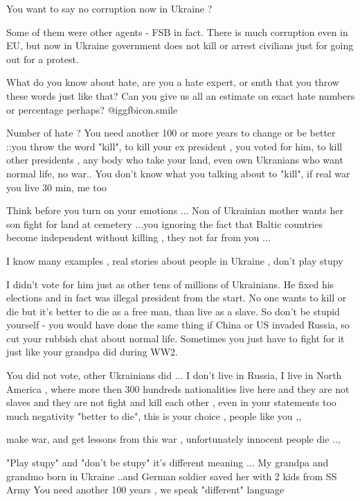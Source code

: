 \begin{itemize}
\begin{itemize}
You want to say no corruption now in Ukraine ?


Some of them were other agents - FSB in fact. There is much corruption even in
EU, but now in Ukraine government does not kill or arrest civilians just for
going out for a protest.

What do you know about hate, are you a hate expert, or smth that you throw
these words just like that? Can you give us all an estimate on exact hate
numbers or percentage perhaps?  @igg{fbicon.smile} 


Number of hate ? You need another 100 or more years to change or be better
::you throw the word "kill", to kill your ex president , you voted for him, to
kill other presidents , any body who take your land, even own Ukranians who
want normal life, no war.. You don't know what you talking about to "kill", if
real war you live 30 min, me too

Think before you turn on your emotions ... Non of Ukrainian mother wants her
son fight for land at cemetery ...you ignoring the fact that Baltic countries
become independent without killing , they not far from you ...

I know many examples , real stories about people in Ukraine , don't play stupy


I didn't vote for him just as other tens of millions of Ukrainians. He fixed
his elections and in fact was illegal president from the start. No one wants to
kill or die but it's better to die as a free man, than live as a slave. So
don't be stupid yourself - you would have done the same thing if China or US
invaded Russia, so cut your rubbish chat about normal life. Sometimes you just
have to fight for it just like your grandpa did during WW2.


You did not vote, other Ukrainians did ... I don't live in Russia, I live in
North America , where more then 300 hundreds nationalities live here and they
are not slaves and they are not fight and kill each other , even in your
statements too much negativity "better to die", this is your choice , people
like you ,,

make war, and get lessons from this war , unfortunately innocent people die ..,

"Play stupy" and "don't be stupy" it's different meaning ... My grandpa and
grandmo born in Ukraine ..and German soldier saved her with 2 kids from SS Army
You need another 100 years , we speak "different" language


\end{itemize}
\end{itemize}

